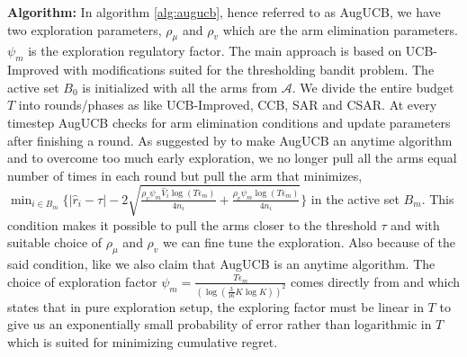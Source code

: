 \label{notation}

\textbf{Algorithm:} In algorithm \ref{alg:augucb}, hence referred to as AugUCB, we have two exploration parameters, $\rho_{\mu}$ and $\rho_v$ which are the arm elimination parameters. $\psi_{m}$ is the exploration regulatory factor. The main approach is based on UCB-Improved with modifications suited for the thresholding bandit problem. The active set $B_{0}$ is initialized with all the arms from $\mathcal{A}$. We divide the entire budget $T$ into rounds/phases as like UCB-Improved, CCB, SAR and CSAR. At every timestep AugUCB checks for arm elimination conditions and update parameters after finishing a round. As suggested by \cite{liu2016modification} to make AugUCB an anytime algorithm and to overcome too much early exploration, we no longer pull all the arms equal number of times in each round but pull the arm that minimizes,  
$\min_{i\in B_{m}}\big\lbrace |\hat{r}_{i} - \tau | - 2\sqrt{\frac{\rho_v\psi_m \hat{V}_{i} \log ( T \epsilon_{m})}{4 n_{i}} + \frac{\rho_v\psi_m \log{( T\epsilon_{m})}}{4 n_{i}}} \big\rbrace $
in the active set $B_{m}$. This condition makes it possible to pull the arms closer to the threshold $\tau$ and with suitable choice of $\rho_{\mu}$ and $\rho_v$ we can fine tune the exploration. Also because of the said condition, like \cite{liu2016modification} we also claim that AugUCB is an anytime algorithm. The choice of exploration factor $\psi_m=\frac{T\epsilon_m}{(\log(\frac{3}{16} K\log K))^{2}}$ comes directly from \cite{audibert2010best} and \cite{bubeck2011pure} which states that in pure exploration setup, the exploring factor must be linear in $T$ to give us an exponentially small probability of error rather than logarithmic in $T$ which is suited for minimizing cumulative regret.
